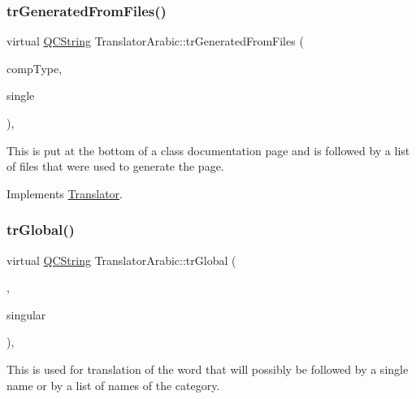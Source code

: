\mbox{\label{class_translator_arabic_ab6b9b20ba86764e71700e42c1fe12946}} 
\subsubsection{\texorpdfstring{trGeneratedFromFiles()}{trGeneratedFromFiles()}}
{\footnotesize\ttfamily virtual \mbox{\hyperlink{class_q_c_string}{Q\+C\+String}} Translator\+Arabic\+::tr\+Generated\+From\+Files (\begin{DoxyParamCaption}\item[{\mbox{\hyperlink{class_class_def_ae70cf86d35fe954a94c566fbcfc87939}{Class\+Def\+::\+Compound\+Type}}}]{comp\+Type,  }\item[{bool}]{single }\end{DoxyParamCaption})\hspace{0.3cm}{\ttfamily [inline]}, {\ttfamily [virtual]}}

This is put at the bottom of a class documentation page and is followed by a list of files that were used to generate the page. 

Implements \mbox{\hyperlink{class_translator}{Translator}}.

\mbox{\label{class_translator_arabic_a27d1fb78bcb37b60d150951b6b434ef1}} 
\subsubsection{\texorpdfstring{trGlobal()}{trGlobal()}}
{\footnotesize\ttfamily virtual \mbox{\hyperlink{class_q_c_string}{Q\+C\+String}} Translator\+Arabic\+::tr\+Global (\begin{DoxyParamCaption}\item[{bool}]{,  }\item[{bool}]{singular }\end{DoxyParamCaption})\hspace{0.3cm}{\ttfamily [inline]}, {\ttfamily [virtual]}}

This is used for translation of the word that will possibly be followed by a single name or by a list of names of the category. 

